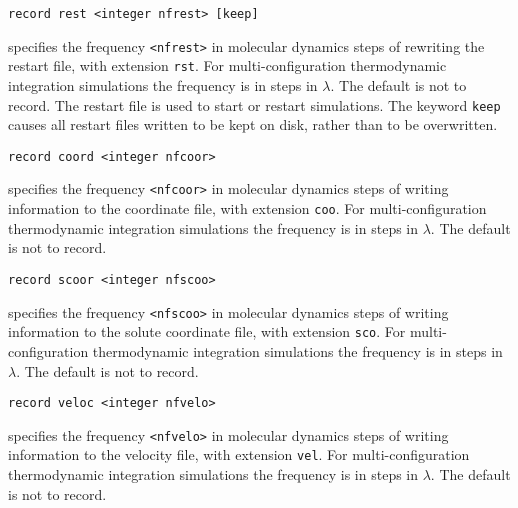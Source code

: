 \begin{description}


\item
\begin{verbatim}
record rest <integer nfrest> [keep]
\end{verbatim}
specifies the frequency \verb+<nfrest>+ in molecular dynamics steps
of rewriting the restart file, with extension \verb+rst+. 
For multi-configuration
thermodynamic integration simulations the frequency is in
steps in $\lambda$. The default is not to record. The restart
file is used to start or restart simulations. The keyword {\tt keep}
causes all restart files written to be kept on disk, rather than
to be overwritten.

\item
\begin{verbatim}
record coord <integer nfcoor>
\end{verbatim}
specifies the frequency \verb+<nfcoor>+ in molecular dynamics steps
of writing information to the coordinate file, with extension \verb+coo+. 
For multi-configuration
thermodynamic integration simulations the frequency is in
steps in $\lambda$. The default is not to record.

\item
\begin{verbatim}
record scoor <integer nfscoo>
\end{verbatim}
specifies the frequency \verb+<nfscoo>+ in molecular dynamics steps
of writing information to the solute coordinate file, with extension
\verb+sco+. For multi-configuration
thermodynamic integration simulations the frequency is in
steps in $\lambda$. The default is not to record.

\item
\begin{verbatim}
record veloc <integer nfvelo>
\end{verbatim}
specifies the frequency \verb+<nfvelo>+ in molecular dynamics steps
of writing information to the velocity file, with extension \verb+vel+.
For multi-configuration
thermodynamic integration simulations the frequency is in
steps in $\lambda$. The default is not to record.


\end{description}
